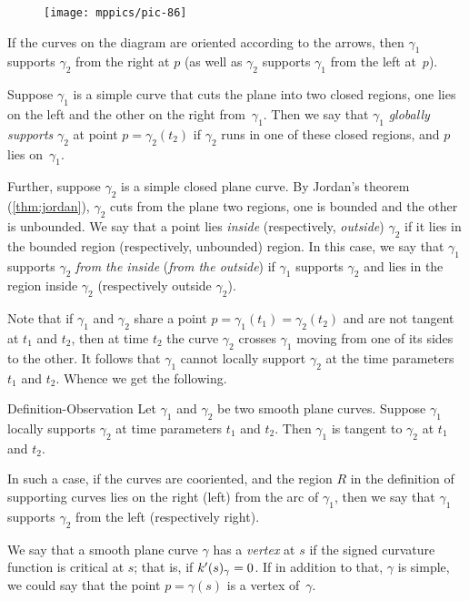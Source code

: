 \begin{wrapfigure}[8]{o}{43 mm}
\vskip-4mm
\centering
\texttt{[image: mppics/pic-86]}
\vskip0mm
\end{wrapfigure}

If the curves on the diagram are oriented according to the arrows, then $\gamma_1$ supports $\gamma_2$ from the right at $p$ (as well as $\gamma_2$ supports $\gamma_1$ from the left at~$p$).

Suppose $\gamma_1$ is a simple curve that cuts the plane into two closed regions, one lies on the left and the other on the right from~$\gamma_1$.
Then we say that $\gamma_1$ \emph{globally supports} $\gamma_2$ at point $p=\gamma_2(t_2)$ 
if $\gamma_2$ runs in one of these closed regions, and 
$p$ lies on~$\gamma_1$.

Further, suppose $\gamma_2$ is a simple closed plane curve.
By Jordan's theorem (\ref{thm:jordan}), $\gamma_2$ cuts from the plane two regions, one is bounded and the other is unbounded.
We say that a point lies {}\emph{inside} (respectively, {}\emph{outside}) $\gamma_2$ if it lies in the bounded region (respectively, unbounded) region.
In this case, we say that $\gamma_1$ supports $\gamma_2$ \emph{from the inside} (\emph{from the outside}) if $\gamma_1$ supports $\gamma_2$ and lies in the region inside $\gamma_2$ (respectively outside $\gamma_2$). 

Note that if $\gamma_1$ and $\gamma_2$ share a point $p=\gamma_1(t_1)=\gamma_2(t_2)$ and are not tangent at $t_1$ and $t_2$, then at time $t_2$ the curve $\gamma_2$ crosses $\gamma_1$  moving from one of its sides to the other.
It follows that $\gamma_1$ cannot locally support $\gamma_2$ at the time parameters $t_1$ and $t_2$.
Whence we get the following.

\begin{thm}{Definition-Observation}
Let $\gamma_1$ and $\gamma_2$ be two smooth plane curves.
Suppose $\gamma_1$ locally supports $\gamma_2$ at time parameters $t_1$ and $t_2$.
Then $\gamma_1$ is tangent to $\gamma_2$ at $t_1$ and $t_2$.

In such a case, if the curves are cooriented, and the region $R$ in the definition of supporting curves lies on the right (left) from the arc of $\gamma_1$, then we say that 
$\gamma_1$ supports $\gamma_2$ from the left (respectively right).
\end{thm}

We say that a smooth plane curve $\gamma$ has a \emph{vertex} at $s$
if the signed curvature function is critical at $s$;
that is, if $k'(s)_\gamma=0$.
If in addition to that, $\gamma$ is simple, we could say that the point $p=\gamma(s)$ is a vertex of~$\gamma$.


